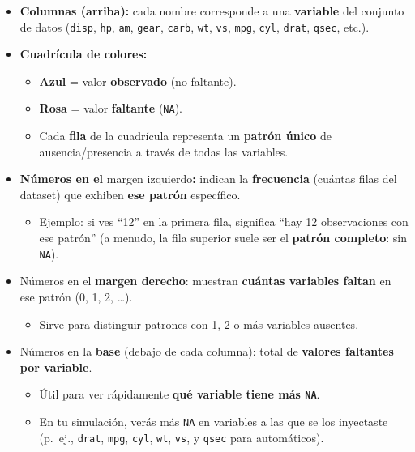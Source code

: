 \documentclass[
]{book}
\providecommand{\tightlist}{%
  \setlength{\itemsep}{0pt}\setlength{\parskip}{0pt}}
\begin{document}
\begin{itemize}
\item
  \textbf{Columnas (arriba):} cada nombre corresponde a una \textbf{variable} del conjunto de datos (\texttt{disp}, \texttt{hp}, \texttt{am}, \texttt{gear}, \texttt{carb}, \texttt{wt}, \texttt{vs}, \texttt{mpg}, \texttt{cyl}, \texttt{drat}, \texttt{qsec}, etc.).
\item
  \textbf{Cuadrícula de colores:}

  \begin{itemize}
  \tightlist
  \item
    \textbf{Azul} = valor \textbf{observado} (no faltante).
  \item
    \textbf{Rosa} = valor \textbf{faltante} (\texttt{NA}).
  \item
    Cada \textbf{fila} de la cuadrícula representa un \textbf{patrón único} de ausencia/presencia a través de todas las variables.
  \end{itemize}
\item
  \textbf{Números en el }margen izquierdo\textbf{:} indican la \textbf{frecuencia} (cuántas filas del dataset) que exhiben \textbf{ese patrón} específico.

  \begin{itemize}
  \tightlist
  \item
    Ejemplo: si ves ``12'' en la primera fila, significa ``hay 12 observaciones con ese patrón'' (a menudo, la fila superior suele ser el \textbf{patrón completo}: sin \texttt{NA}).
  \end{itemize}
\item
  Números en el \textbf{margen derecho}: muestran \textbf{cuántas variables faltan} en ese patrón (0, 1, 2, \ldots).

  \begin{itemize}
  \tightlist
  \item
    Sirve para distinguir patrones con 1, 2 o más variables ausentes.
  \end{itemize}
\item
  Números en la \textbf{base} (debajo de cada columna): total de \textbf{valores faltantes por variable}.

  \begin{itemize}
  \tightlist
  \item
    Útil para ver rápidamente \textbf{qué variable tiene más \texttt{NA}}.
  \item
    En tu simulación, verás más \texttt{NA} en variables a las que se los inyectaste (p.~ej., \texttt{drat}, \texttt{mpg}, \texttt{cyl}, \texttt{wt}, \texttt{vs}, y \texttt{qsec} para automáticos).
  \end{itemize}
\end{itemize}
\end{document}
